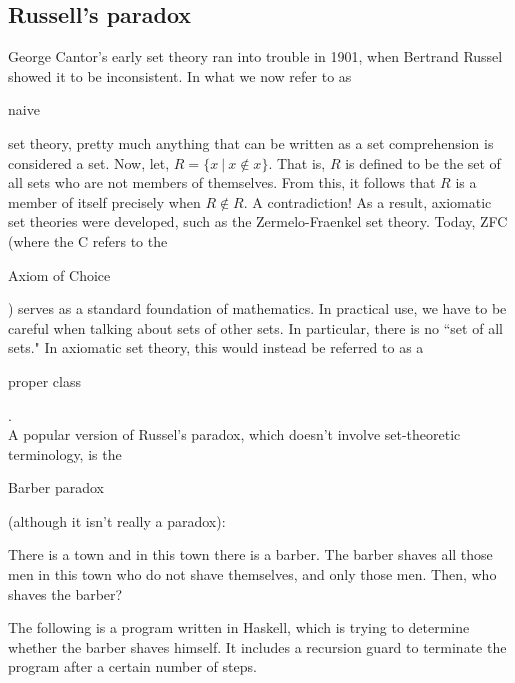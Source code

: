 \documentclass[11pt]{article}
\theoremstyle{plain}
\theoremstyle{definition}
\begin{document}
\subsection*{Russell's paradox}

George Cantor's early set theory ran into trouble in 1901, when Bertrand Russel showed it to be inconsistent. In what we now refer to as \begin{em}naive\end{em} set theory, pretty much anything that can be written as a set comprehension is considered a set. Now, let, $ R = \{ x \ | \ x \notin x \} $. That is, $ R $ is defined to be the set of all sets who are not members of themselves. From this, it follows that $ R $ is a member of itself precisely when $R \notin R$. A contradiction! 
As a result, axiomatic set theories were developed, such as the Zermelo-Fraenkel set theory. Today, ZFC (where the C refers to the \begin{em}Axiom of Choice\end{em}) serves as a standard foundation of mathematics.
In practical use, we have to be careful when talking about sets of other sets. In particular, there is no ``set of all sets." In axiomatic set theory, this would instead be referred to as a \begin{em}proper class\end{em}. \\
  
\noindent A popular version of Russel's paradox, which doesn't involve set-theoretic terminology, is the \begin{em}Barber paradox\end{em} (although it isn't really a paradox):
\begin{displayquote}\begin{em}
There is a town and in this town there is a barber. The barber shaves all those men in this town who do not shave themselves, and only those men. Then, who shaves the barber?
\end{em}\end{displayquote}

\noindent The following is a program written in Haskell, which is trying to determine whether the barber shaves himself. It includes a recursion guard to terminate the program after a certain number of steps.
\end{document}
